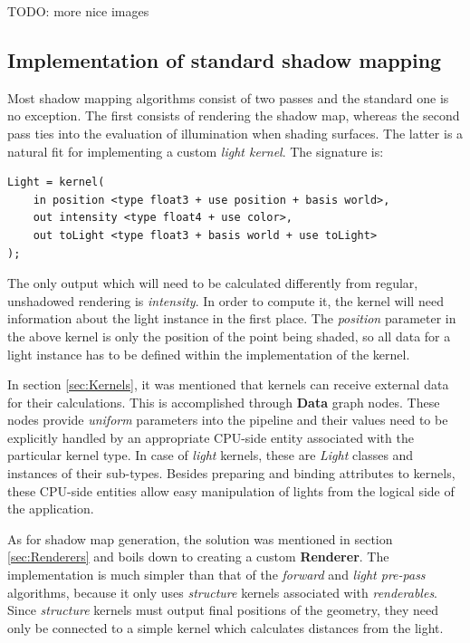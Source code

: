 TODO: more nice images

\subsection{Implementation of standard shadow mapping}

Most shadow mapping algorithms consist of two passes and the standard one is no exception. The first consists of rendering the shadow map, whereas the second pass ties into the evaluation of illumination when shading surfaces. The latter is a natural fit for implementing a custom \emph{light kernel}. The signature is:
	
\begin{lstlisting}[frame=single]
Light = kernel(
    in position <type float3 + use position + basis world>,
    out intensity <type float4 + use color>,
    out toLight <type float3 + basis world + use toLight>
);
\end{lstlisting}

The only output which will need to be calculated differently from regular, unshadowed rendering is \emph{intensity}. In order to compute it, the kernel will need information about the light instance in the first place. The \emph{position} parameter in the above kernel is only the position of the point being shaded, so all data for a light instance has to be defined within the implementation of the kernel.

In section \ref{sec:Kernels}, it was mentioned that kernels can receive external data for their calculations. This is accomplished through \textbf{Data} graph nodes. These nodes provide \emph{uniform} parameters into the pipeline and their values need to be explicitly handled by an appropriate CPU-side entity associated with the particular kernel type. In case of \emph{light} kernels, these are \emph{Light} classes and instances of their sub-types. Besides preparing and binding attributes to kernels, these CPU-side entities allow easy manipulation of lights from the logical side of the application.

As for shadow map generation, the solution was mentioned in section \ref{sec:Renderers} and boils down to creating a custom \textbf{Renderer}. The implementation is much simpler than that of the \emph{forward} and \emph{light pre-pass} algorithms, because it only uses \emph{structure} kernels associated with \emph{renderables}. Since \emph{structure} kernels must output final positions of the geometry, they need only be connected to a simple kernel which calculates distances from the light.

